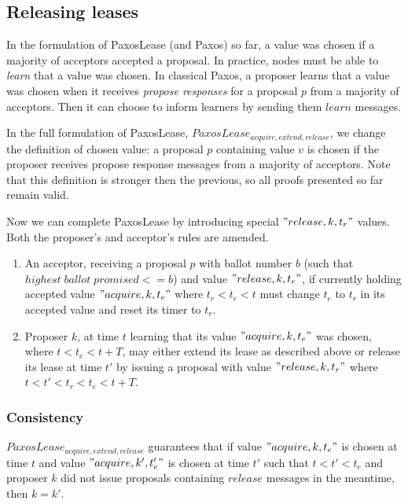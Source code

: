 \documentclass[12pt]{article}
\begin{document}
\subsection{ Releasing leases }

In the formulation of PaxosLease (and Paxos) so far, a value was chosen if a majority of acceptors accepted a proposal. In practice, nodes must be able to \emph{learn} that a value was chosen. In classical Paxos, a proposer learns that a value was chosen when it receives \emph{propose responses} for a proposal $p$ from a majority of acceptors. Then it can choose to inform learners by sending them $learn$ messages.

In the full formulation of PaxosLease, $PaxosLease_{acquire, extend, release}$, we change the definition of chosen value: a proposal $p$ containing value $v$ is chosen if the proposer receives propose response messages from a majority of acceptors.
Note that this definition is stronger then the previous, so all proofs presented so far remain valid.

Now we can complete PaxosLease by introducing special $"release, k, t_r"$ values. Both the proposer's and acceptor's rules are amended.

\begin{enumerate}

\item An acceptor, receiving a proposal $p$ with ballot number $b$ (such that $highest \; ballot \; promised <= b$) and value $"release, k, t_r"$, if currently holding accepted value $"acquire, k, t_e"$ where $t_r < t_e < t$ must change $t_e$ to $t_r$ in its accepted value and reset its timer to $t_r$.

\item Proposer $k$, at time $t$ learning that its value $"acquire, k, t_e"$ was chosen, where $t < t_e < t + T$, may either extend its lease as described above or release its lease at time $t'$ by issuing a proposal with value $"release, k, t_r"$ where $t < t' <  t_r < t_e < t + T$.

\end{enumerate}

\subsubsection{ Consistency } $PaxosLease_{acquire, extend, release}$ guarantees that if value $"acquire, k, t_e"$ is chosen at time $t$ and value $"acquire, k', t_e'"$ is chosen at time $t'$ such that $t < t' < t_e$ and proposer $k$ did not issue proposals containing $release$ messages in the meantime, then $k = k'$.
\end{document}

